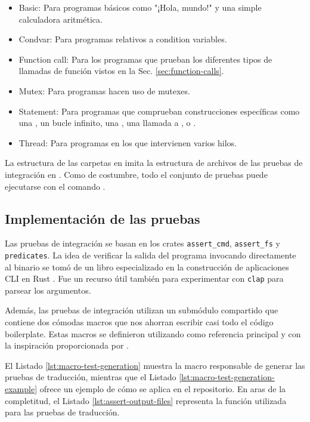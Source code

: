 \begin{itemize}
  \item Basic: Para programas básicos como "¡Hola, mundo!" y una simple calculadora aritmética.
  \item Condvar: Para programas relativos a condition variables.
  \item Function call: Para los programas que prueban los diferentes tipos de llamadas de función
        vistos en la Sec. \ref{sec:function-calls}.
  \item Mutex: Para programas hacen uso de mutexes.
  \item Statement: Para programas que comprueban construcciones específicas como una ,
        un bucle infinito, una , una llamada a ,
        o .
  \item Thread: Para programas en los que intervienen varios hilos.
\end{itemize}

La estructura de las carpetas en  imita la estructura de archivos
de las pruebas de integración en .
Como de costumbre, todo el conjunto de pruebas puede ejecutarse con el comando .

\subsection{Implementación de las pruebas}

Las pruebas de integración se basan en los crates \texttt{assert\_cmd},
\texttt{assert\_fs} y \texttt{predicates}.
La idea de verificar la salida del programa invocando directamente al binario se tomó de un
libro especializado en la construcción de aplicaciones \acrshort{CLI} en Rust \cite[Chap. 1.6]{rust-cli-book}.
Fue un recurso útil también para experimentar con \texttt{clap} para parsear los argumentos.

Además, las pruebas de integración utilizan un submódulo compartido \cite[Chap. 11.3]{rust-book}
que contiene dos cómodas macros que nos ahorran escribir casi todo el código
boilerplate. Estas macros se definieron utilizando \cite{rust-macros} como referencia
principal y con la inspiración proporcionada por \cite{oaten2023}.

El Listado \ref{lst:macro-test-generation} muestra la macro
responsable de generar las pruebas de traducción,
mientras que el Listado \ref{lst:macro-test-generation-example}
ofrece un ejemplo de cómo se aplica en el repositorio.
En aras de la completitud, el Listado
\ref{lst:assert-output-files} representa la función utilizada para las pruebas de traducción.


